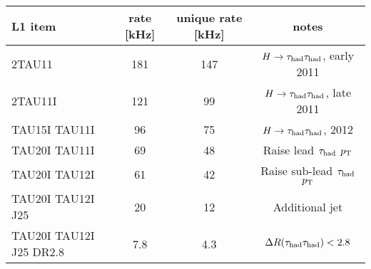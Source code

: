\begin{tabular}{lccc}
  L1 item                 & rate [kHz] & unique rate [kHz] & notes \\
  \hline
  2TAU11                  & 181        & 147               & $H\rightarrow\tau_\text{had}\tau_\text{had}$, early 2011       \\
  2TAU11I                 & 121        &  99               & $H\rightarrow\tau_\text{had}\tau_\text{had}$, late 2011        \\
  TAU15I TAU11I           &  96        &  75               & $H\rightarrow\tau_\text{had}\tau_\text{had}$, 2012             \\
  TAU20I TAU11I           &  69        &  48               & Raise lead $\tau_\text{had}$ $p_{\mathrm{T}}$     \\
  TAU20I TAU12I           &  61        &  42               & Raise sub-lead $\tau_\text{had}$ $p_{\mathrm{T}}$ \\
  TAU20I TAU12I J25       &  20        &  12               & Additional jet            \\
  TAU20I TAU12I J25 DR2.8 &   7.8      &   4.3             & $\Delta R(\tau_\text{had}\tau_\text{had}) < 2.8$          \\
\end{tabular}

